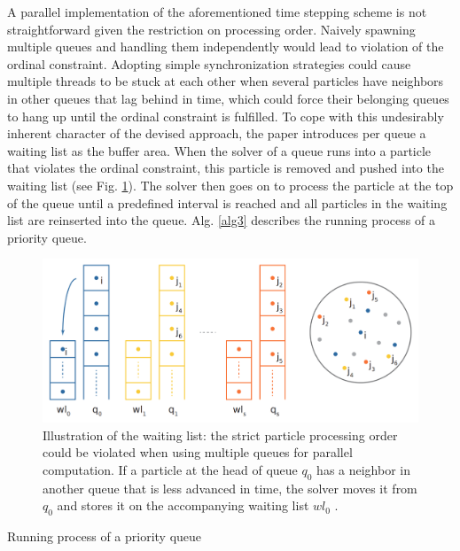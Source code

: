 \documentclass[
	11pt, 
	DIV10,
	ngerman,
	a4paper, 
	oneside, 
	headings=normal, 
	captions=tableheading,
	final, 
	numbers=noenddot
]{scrartcl}
\begin{document}
A parallel implementation of the aforementioned time stepping scheme is not straightforward given the restriction on processing order. Naively spawning multiple queues and handling them independently would lead to violation of the ordinal constraint. Adopting simple synchronization strategies could cause multiple threads to be stuck at each other when several particles have neighbors in other queues that lag behind in time, which could force their belonging queues to hang up until the ordinal constraint is fulfilled. To cope with this undesirably inherent character of the devised approach, the paper introduces per queue a waiting list as the buffer area. When the solver of a queue runs into a particle that violates the ordinal constraint, this particle is removed and pushed into the waiting list (see Fig. \ref{fig5}). The solver then goes on to process the particle at the top of the queue until a predefined interval is reached and all particles in the waiting list are reinserted into the queue. Alg. \ref{alg3} describes the running process of a priority queue.

\begin{figure}[tb]
	\centering
	\includegraphics[scale=0.25]{images/6}
	\caption{\label{fig5} Illustration of the waiting list: the strict particle processing order could be violated when using multiple queues for parallel computation. If a particle at the head of queue $ q_{0} $ has a neighbor in another queue that is less advanced in time, the solver moves it from $ q_{0} $ and stores it on the accompanying waiting list $ wl_{0} $ \cite{reinhardt2017fully}.}
\end{figure}

\large
\begin{algorithm}
	\DontPrintSemicolon
	\SetAlgoLined
	\SetAlCapNameFnt{\large}
	\SetAlCapFnt{\large}
	\caption{\label{alg3} Running process of a priority queue \cite{reinhardt2017fully}}
\end{algorithm}
\normalsize
\end{document}
